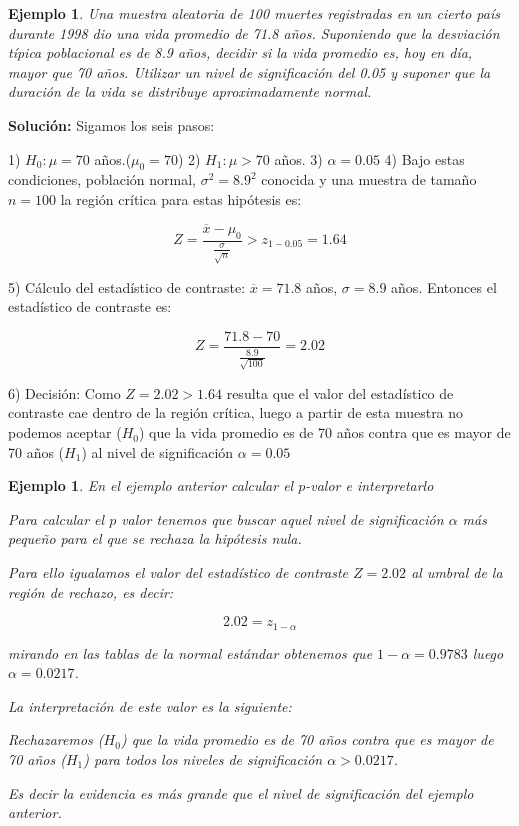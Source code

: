 \documentclass[12pt]{report}
\newtheorem{example}[definition]{Ejemplo}
\begin{document}
    \begin{example}
    Una muestra aleatoria de 100 muertes registradas en un cierto
    país durante 1998 dio una vida promedio de 71.8 años. Suponiendo
    que la desviación típica poblacional es de 8.9 años, decidir si la
    vida promedio es, hoy en día, mayor que 70 años. Utilizar un nivel de
    significación del 0.05 y suponer que la duración de la vida se
    distribuye aproximadamente normal.
     \end{example}
     \textbf{Solución:}
  Sigamos los seis pasos:
 

 1) $H_{0}:\mu=70$ años.($\mu_{0}=70$)  
 2) $H_{1}:\mu>70$ años.  
 3) $\alpha=0.05$  
 4) Bajo estas condiciones, población normal, $\sigma^2=8.9^2$ conocida
 y una muestra de tamaño $n=100$ la región crítica para estas
 hipótesis es:

 $$Z=\frac{\overline{x}-\mu_{0}}{\frac{\sigma}{\sqrt{n}}}>z_{1-0.05}=1.64$$

 5) Cálculo del estadístico de contraste:
 $\overline{x}=71.8$ años, $\sigma=8.9$ años. Entonces el estadístico
 de contraste es:

 $$Z=\frac{71.8-70}{\frac{8.9}{\sqrt{100}}}=2.02$$

 6) Decisión: Como $Z=2.02>1.64$ resulta que el valor del estadístico
 de contraste cae dentro de la región crítica, luego  a partir de esta
 muestra no podemos
 aceptar ($H_{0}$) que la vida promedio es de 70 años contra que es
 mayor de 70 años ($H_{1}$) al nivel de significación $\alpha=0.05$

    \begin{example}
En el ejemplo anterior calcular el $p$-valor e interpretarlo


Para calcular el $p$ valor tenemos que buscar aquel nivel de
significación $\alpha$ más pequeño para el que se rechaza la
hipótesis nula.

Para ello igualamos el valor del estadístico de contraste $Z=2.02$
al umbral de la región de rechazo, es decir:

    $$2.02=z_{1-\alpha}$$

mirando en las tablas de la normal estándar obtenemos que
    $1-\alpha=0.9783$ luego $\alpha=0.0217$.

    La interpretación de este valor es la siguiente:
    
    Rechazaremos ($H_{0}$) que la vida promedio es de 70 años contra que es
 mayor de 70 años ($H_{1}$) para todos los niveles de  significación
 $\alpha>0.0217$.

 Es decir la evidencia es más grande que el nivel de significación
 del ejemplo anterior.
\end{example}
\end{document}
